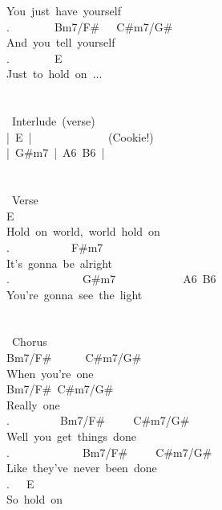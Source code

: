 {You\ just\ have\ yourself\ \\
.\ \ \ \ \ \ \ \ Bm7/F\#\ \ \ C\#m7/G\#\\
And\ you\ tell\ yourself\\
.\ \ \ \ \ \ \ \ E\\
Just\ to\ hold\ on\ ...\\
\\
\\
\lbrack\ Interlude\rbrack\ (verse)\\
|\ E\ |\ %
\ \ \ \ \ \ \ \ \ \ \ \ (Cookie!)\\
|\ G\#m7\ |\ A6\ B6\ |\\
\\
\\
\lbrack\ Verse\rbrack\\
E\ \\
Hold\ on\ world,\ world\ hold\ on\\
.\ \ \ \ \ \ \ \ \ \ \ F\#m7\\
It's\ gonna\ be\ alright\\
.\ \ \ \ \ \ \ \ \ \ \ \ \ G\#m7\ \ \ \ \ \ \ \ \ \ \ \ A6\ B6\\
You're\ gonna\ see\ the\ light\\
\\
\\
\lbrack\ Chorus\rbrack\\
Bm7/F\#\ \ \ \ \ \ C\#m7/G\#\\
When\ you're\ one\\
Bm7/F\#\ C\#m7/G\#\\
Really\ one\\
.\ \ \ \ \ \ \ \ \ Bm7/F\#\ \ \ \ \ C\#m7/G\#\\
Well\ you\ get\ things\ done\\
.\ \ \ \ \ \ \ \ \ \ \ \ \ Bm7/F\#\ \ \ \ \ C\#m7/G\#\\
Like\ they've\ never\ been\ done\\
.\ \ \ E\\
So\ hold\ on}
